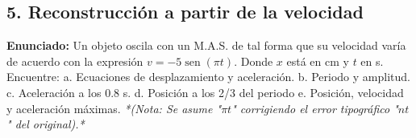 \documentclass[12pt, letterpaper]{article}
\begin{document}

\subsection*{5. Reconstrucción a partir de la velocidad}
\noindent \textbf{Enunciado:} Un objeto oscila con un M.A.S. de tal forma que su velocidad varía de acuerdo con la expresión $v = -5 \operatorname{sen}(\pi t)$. Donde $x$ está en cm y $t$ en s. Encuentre: a. Ecuaciones de desplazamiento y aceleración. b. Periodo y amplitud. c. Aceleración a los 0.8 s. d. Posición a los 2/3 del periodo e. Posición, velocidad y aceleración máximas.
\textit{*(Nota: Se asume "$\pi t$" corrigiendo el error tipográfico "$nt$" del original).* }
\end{document}
